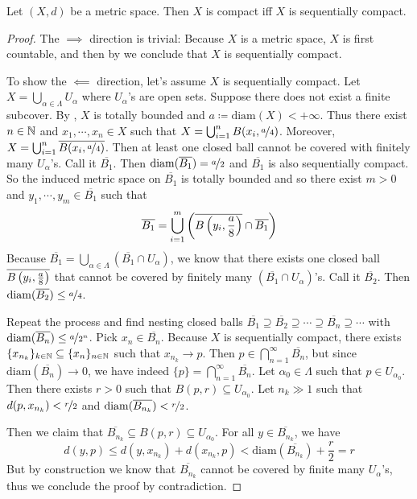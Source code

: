 \documentclass[screen]{techreport}
\numberwithin{equation}{section}
\begin{document}
\begin{proposition}\label{Prop:MetricCompactIffSeqCompact}
	Let $(X,d)$ be a metric space.
	Then $X$ is compact iff $X$ is sequentially compact.
\end{proposition}
\begin{proof}
	The ${\implies}$ direction is trivial: Because $X$ is a metric space, $X$ is first countable, and then by  we conclude that $X$ is sequentially compact.
	
	To show the ${\impliedby}$ direction, let's assume $X$ is sequentially compact.
	Let $X = \bigcup_{\alpha \in \Lambda} U_\alpha$ where $U_\alpha$'s are open sets.
	Suppose there does not exist a finite subcover.
	By , $X$ is totally bounded and $a	\coloneqq \mathrm{diam}(X) < +\infty$.
	Thus there exist $n \in \mathbb{N}$ and $x_1,\cdots,x_n \in X$ such that $X = \bigcup_{i=1}^n B(x_i, \nicefrac{a}{4})$.
	Moreover, $X = \bigcup_{i=1}^n \overline{B(x_i, \nicefrac{a}{4})}$.
	Then at least one closed ball cannot be covered with finitely many $U_\alpha$'s.
	Call it $\overline{B_1}$. Then $\mathrm{diam}(\overline{B_1}) = \nicefrac{a}{2}$ and $\overline{B_1}$ is also sequentially compact.
	So the induced metric space on $\overline{B_1}$ is totally bounded and so there exist $m > 0$ and $y_1,\cdots,y_m \in \overline{B_1}$ such that
	\[
	\overline{B_1} = \bigcup_{i=1}^m\left({ \overline{B\left({y_i,\frac{a}{8}}\right)} \cap \overline{B_1} }\right)
	\]
	Because $\overline{B_1}=\bigcup_{\alpha \in \Lambda} (\overline{B_1} \cap U_\alpha)$, we know that there exists one closed ball $\overline{B\left({y_i,\frac{a}{8}}\right)}$ that cannot be covered by finitely many $(\overline{B_1} \cap U_\alpha)$'s.
	Call it $\overline{B_2}$. Then $\mathrm{diam}(\overline{B_2}) \le \nicefrac{a}{4}$.
	
	Repeat the process and find nesting closed balls $\overline{B_1} \supseteq \overline{B_2} \supseteq \cdots \supseteq \overline{B_n} \supseteq \cdots$ with $\mathrm{diam}(\overline{B_n}) \le \nicefrac{a}{2^n}$.
	Pick $x_n \in \overline{B_n}$.
	Because $X$ is sequentially compact, there exists $\{x_{n_k}\}_{k \in \mathbb{N}} \subseteq \{x_n\}_{n \in \mathbb{N}}$ such that $x_{n_k} \rightarrow p$.
	Then $p \in \bigcap_{n=1}^\infty \overline{B_n}$, but since $\mathrm{diam}(\overline{B_n}) \rightarrow 0$, we have indeed $\{p\} = \bigcap_{n=1}^\infty \overline{B_n}$.
	Let $\alpha_0 \in \Lambda$ such that $p \in U_{\alpha_0}$.
	Then there exists $r > 0$ such that $B(p,r) \subseteq U_{\alpha_0}$.
	Let $n_k \gg 1$ such that $d(p,x_{n_k}) < \nicefrac{r}{2}$ and $\mathrm{diam}(\overline{B_{n_k}}) < \nicefrac{r}{2}$.
	
	Then we claim that $\overline{B_{n_k}} \subseteq B(p,r) \subseteq U_{\alpha_0}$.
	For all $y \in \overline{B_{n_k}}$, we have
	\[
	d(y,p) \le d(y,x_{n_k}) + d(x_{n_k}, p) < \mathrm{diam}(\overline{B_{n_k}}) + \frac{r}{2} = r
	\]
	But by construction we know that $\overline{B_{n_k}}$ cannot be covered by finite many $U_\alpha$'s, thus we conclude the proof by contradiction.
\end{proof}
\end{document}

